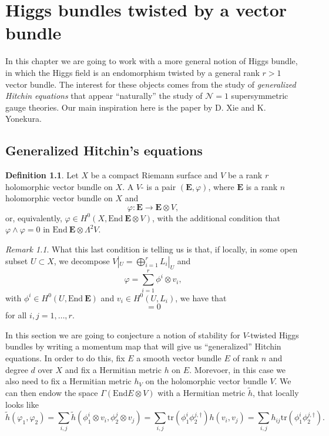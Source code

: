 \documentclass[12pt,a4paper]{book}
\theoremstyle{definition} \newtheorem{defn}[thm]{Definition}
\theoremstyle{definition} \newtheorem{ejemplo}[thm]{Example}
\theoremstyle{remark} \newtheorem{rem}[thm]{Remark}
\def\tr{\mathrm{tr}}
\def\End{\mathrm{End}}
\newcommand{\ve}[1]{\mathbf{#1}}
\let\emph\relax
\begin{document}
    \chapter{Higgs bundles twisted by a vector bundle}
    In this chapter we are going to work with a more general notion of Higgs bundle, in which the Higgs field is an endomorphism twisted by a general rank $r>1$ vector bundle. The interest for these objects comes from the study of \textit{generalized Hitchin equations} that appear ``naturally'' the study of $\mathcal{N}=1$ supersymmetric gauge theories. Our main inspiration here is the paper \cite{xieyonekura} by D. Xie and K. Yonekura.

    \section{Generalized Hitchin's equations}

    \begin{defn}
      Let $X$ be a compact Riemann surface and $V$ be a rank $r$ holomorphic vector bundle on $X$. A $V$-\emph{twisted Higgs bundle} is a pair $(\ve{E},\varphi)$, where $\ve{E}$ is a rank $n$ holomorphic vector bundle on $X$ and
      \begin{equation*}
	\varphi: \ve{E} \longrightarrow \ve{E} \otimes V,
      \end{equation*}
      or, equivalently, $\varphi \in H^0(X,\End\ \ve{E} \otimes V)$, with the additional condition that 
      $	\varphi \wedge \varphi =0$ in $\End\ \ve{E} \otimes \Lambda^2 V$.
    \end{defn}

    \begin{rem}
      What this last condition is telling us is that, if locally, in some open subset $U\subset X$, we decompose $V|_U=\bigoplus_{i=1}^r L_i|_U$ and 
      \begin{equation*}
	\varphi= \sum_{i=1}^r \phi^i \otimes v_i,
      \end{equation*}
      with $\phi^i \in H^0(U,\End\ \ve{E})$ and $v_i \in H^0(U,L_i)$, we have that
      \begin{equation*}
	[\phi^i,\phi^j]=0
      \end{equation*}
      for all $i,j=1,\dots,r$.
    \end{rem}

    In this section we are going to conjecture a notion of stability for $V$-twisted Higgs bundles by writing a momentum map that will give us ``generalized'' Hitchin equations. In order to do this, fix $E$ a smooth vector bundle $E$ of rank $n$ and degree $d$ over $X$ and fix a Hermitian metric $h$ on $E$. Morevoer, in this case we also need to fix a Hermitian metric $h_V$ on the holomorphic vector bundle $V$. We can then endow the space $\Gamma(\End E \otimes V)$ with a Hermitian metric $\tilde{h}$, that locally looks like
    \begin{equation*}
      \tilde{h}(\varphi_1,\varphi_2)=\sum_{i,j} \tilde{h}(\phi_1^i\otimes v_i,\phi_2^j\otimes v_j)=\sum_{i,j} \tr(\phi_1^i\phi_2^{j,\dagger}) h(v_i,v_j)=\sum_{i,j}h_{ij} \tr(\phi_1^i\phi_2^{j,\dagger}).
    \end{equation*}
\end{document}
